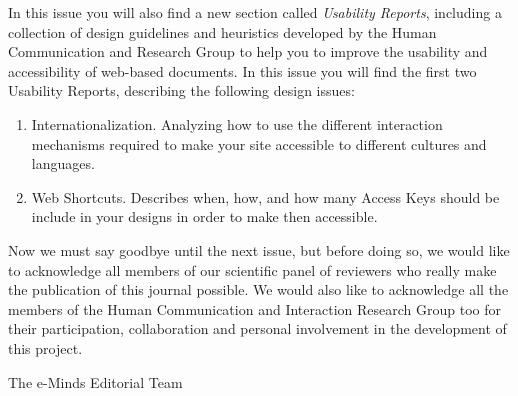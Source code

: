 In this issue you will also find a new section called \textsl{Usability Reports}, including a collection of design guidelines and heuristics developed by the Human Communication and Research Group to help you to improve the usability and accessibility of web-based documents. In this issue you will find the first two Usability Reports, describing the following design issues:

\begin{enumerate}

   \item Internationalization. Analyzing how to use the different interaction mechanisms required to make your site accessible to different cultures and languages.
   \item Web Shortcuts. Describes when, how, and how many Access Keys should be include in your designs in order to make then accessible.
\end{enumerate}

Now we must say goodbye until the next issue, but before doing so, we would like to acknowledge all members of our scientific panel of reviewers who really make the publication of this journal possible. We would also like to acknowledge all the members of the Human Communication and Interaction Research Group too for their participation, collaboration and personal involvement in the development of this project. 

\vspace*{37mm}

\begin{flushright}
The  e-Minds Editorial Team
\end{flushright}

\bigskip


